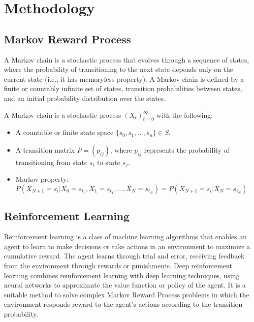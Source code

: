 \section{Methodology}

\subsection{Markov Reward Process}

A Markov chain is a stochastic process that evolves through a sequence of states, where the probability of transitioning to the next state depends only on the current state (i.e., it has memoryless property). A Markov chain is defined by a finite or countably infinite set of states, transition probabilities between states, and an initial probability distribution over the states. 

\begin{definition}
    A Markov chain is a stochastic process $(X_t)_{t=0}^{\infty}$ with the following:
    \begin{itemize}
        \item A countable or finite state space $\{s_0, s_1, ... ,s_n\} \in S$.
        \item A transition matrix $P = (p_{ij})$, where $p_{ij}$ represents the probability of transitioning from state $s_i$ to state $s_j$.
        \item Markov property:
        $P(X_{N+1} = s_i | X_0 = s_{t_0}, X_1 = s_{t_1}, \ldots, X_{N} = s_{t_N}) = P(X_{N+1} = s_i | X_N = s_{t_N})$
    \end{itemize}
\end{definition}


\subsection{Reinforcement Learning}

Reinforcement learning is a class of machine learning algorithms that enables an agent to learn to make decisions or take actions in an environment to maximize a cumulative reward.
The agent learns through trial and error, receiving feedback from the environment through rewards or punishments.
Deep reinforcement learning combines reinforcement learning with deep learning techniques, using neural networks to approximate the value function or policy of the agent.
It is a suitable method to solve complex Markov Reward Process problems in which the environment responds reward to the agent's actions according to the transition probability.

